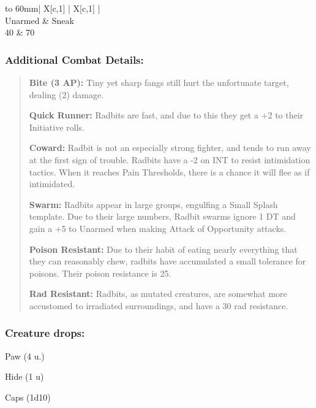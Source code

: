 \documentclass[11pt,a4paper,twocolumn]{book}
\begin{document}
	\bigskip
	{
		\begin{tabu} to 60mm{| X[c,1] | X[c,1] |}
			\hline
			 \\ \hline
			Unarmed & Sneak                          \\
			40      & 70                             \\ \hline
		\end{tabu}
		
	}
	
	\subsubsection*{Additional Combat Details:}
	\begin{verse}
		\textbf{Bite (3 AP):} Tiny yet sharp fangs still hurt the unfortunate target, dealing (2) damage.
		
		\textbf{Quick Runner:} Radbits are fast, and due to this they get a +2 to their Initiative rolls.
		
		\textbf{Coward:} Radbit is not an especially strong fighter, and tends to run away at the first sign of trouble. Radbits have a -2 on INT to resist intimidation tactics. When it reaches Pain Thresholds, there is a chance it will flee as if intimidated.
		
		\textbf{Swarm:} Radbits appear in large groups, engulfing a Small Splash template. Due to their large numbers, Radbit swarms ignore 1 DT and gain a +5 to Unarmed when making Attack of Opportunity attacks.
		
		\textbf{Poison Resistant:} Due to their habit of eating nearly everything that they can reasonably chew, radbits have accumulated a small tolerance for poisons. Their poison resistance is 25. 
		
		\textbf{Rad Resistant:} Radbits, as mutated creatures, are somewhat more accustomed to irradiated surroundings, and have a 30 rad resistance.
	\end{verse}
	
	\subsubsection*{Creature drops:}
	\begin{compactitem}
		\item Paw (4 u.)
		\item Hide (1 u)
		\item Caps (1d10)
	\end{compactitem}
	
\end{document}
